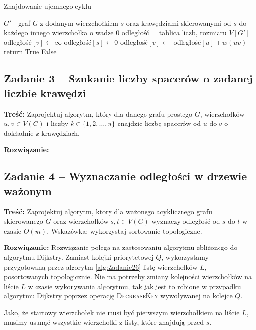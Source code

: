 \begin{algorithm}[H]
	\caption{Znajdowanie ujemnego cyklu}
	\begin{algorithmic}[1]
		\State $G'$ - graf $G$ z dodanym wierzchołkiem $s$
		oraz krawędziami skierowanymi od $s$ do każdego innego
		wierzchołka o wadze $0$
		\State odległość = tablica liczb, rozmiaru $V[G']$
		\State odległość$[v]\gets\infty$
		\EndFor
		\State odległość$[s]\gets0$
		\State odległość$[v]\gets$ odległość$[u] + w(uv)$ 
		\EndIf
		\EndFor
		\EndFor
		\State return True
		\EndIf
		\EndFor
		\State \Return False
		\EndProcedure
	\end{algorithmic}
	\label{Zadanie32}
\end{algorithm}

\subsection{Zadanie 3 -- Szukanie liczby spacerów o zadanej liczbie krawędzi}
\textbf{Treść: }
Zaprojektuj algorytm, który dla danego grafu prostego 
$G$, wierzchołków $u, v \in V(G)$ i liczby $k \in
\{1, 2, \ldots , n\}$ znajdzie liczbę spacerów 
od $u$ do $v$ o dokładnie $k$ krawędziach.

\textbf{Rozwiązanie: }

\subsection{Zadanie 4 -- Wyznaczanie odległości w drzewie ważonym}
\textbf{Treść: } Zaprojektuj algorytm, ktory dla ważonego 
acyklicznego grafu skierowanego $G$ oraz wierzchołków $s, t \in
V(G)$ wyznaczy odległość od $s$ do $t$ w czasie $O(m)$. 
Wskazówka: wykorzystaj sortowanie topologiczne.

\textbf{Rozwiązanie: }
Rozwiązanie polega na zastosowaniu algorytmu zbliżonego do
algorytmu Dijkstry. Zamiast 
kolejki priorytetowej $Q$, wykorzystamy przygotowaną przez algorytm 
\ref{alg:Zadanie26} listę wierzchołków $L$, posortowanych topologicznie.
Nie ma potrzeby zmiany kolejności wierzchołków na liście $L$ w czasie 
wykonywania algorytmu, tak jak jest to robione w przypadku algorytmu
Dijkstry poprzez operację \textsc{DecreaseKey} wywoływanej na kolejce $Q$.

Jako, że startowy wierzchołek nie musi być pierwszym wierzchołkiem na liście $L$,
musimy usunąć wszystkie wierzchołki z listy, które znajdują przed $s$.

